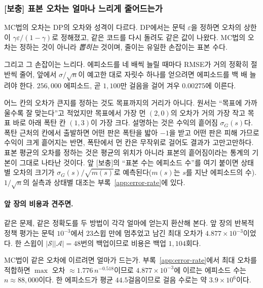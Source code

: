 \documentclass[11pt,a4paper]{article}
\newcommand{\Sset}{\mathcal{S}}
\newcommand{\Aset}{\mathcal{A}}
\begin{document}
\subsubsection{[보충] 표본 오차는 얼마나 느리게 줄어드는가}
\label{sec:error-rate}

MC법의 오차는 DP의 오차와 성격이 다르다. DP에서는 문턱 $\varepsilon$을 정하면 오차의 상한이
$\gamma\varepsilon/(1-\gamma)$로 정해졌고, 같은 코드를 다시 돌려도 같은 값이 나왔다. MC법의 오차는
정하는 것이 아니라 \emph{뽑히는} 것이며, 줄이는 유일한 손잡이는 표본 수다.

그리고 그 손잡이는 느리다. 에피소드를 네 배씩 늘릴 때마다 RMSE가 거의 정확히 절반씩 줄어, 앞에서
$\sigma/\sqrt{n}$이 예고한 대로 자릿수 하나를 얻으려면 에피소드를 백 배 늘려야 한다. $256{,}000$
에피소드, 곧 $1{,}100$만 걸음을 걸어 겨우 $0.00275$에 이른다.

어느 칸의 오차가 큰지를 정하는 것도 목표까지의 거리가 아니다. 원서는 ``목표에 가까울수록 잘
맞는다''고 적었지만 목표에서 가장 먼 $(2,0)$의 오차가 거의 가장 작고 목표 바로 아래 폭탄 칸
$(1,3)$이 가장 크다. 설명하는 것은 수익의 흩어짐 $\sigma_G(s)$다. 폭탄 근처의 칸에서 출발하면 어떤
판은 폭탄을 밟아 $-1$을 받고 어떤 판은 피해 가므로 수익이 크게 흩어지는 반면, 폭탄에서 먼 칸은
무작위로 걸어도 결과가 고만고만하다. 표본 평균의 오차를 정하는 것은 평균의 위치가 아니라 표본의
흩어짐이라는 통계의 기본이 그대로 나타난 것이다. 앞 [보충]의 ``표본 수는 에피소드 수''를 여기 붙이면
상태별 오차의 크기가 $\sigma_G(s)/\sqrt{m(s)}$로 예측된다($m(s)$는 $s$를 지난 에피소드의 수).
$1/\sqrt{n}$의 실측과 상태별 대조는 부록~\ref{app:error-rate}에 있다.

\paragraph{앞 장의 비용과 견주면.}
같은 문제, 같은 정확도를 두 방법이 각각 얼마에 얻는지 환산해 본다. 앞 장의 반복적 정책 평가는 문턱
$10^{-3}$에서 $23$스윕 만에 멈추었고 남긴 최대 오차가 $4.877\times10^{-3}$이었다. 한 스윕이
$|\Sset||\Aset|=48$번의 백업이므로 비용은 백업 $1{,}104$회다.

MC법이 같은 오차에 이르려면 얼마가 드는가. 부록~\ref{app:error-rate}에서 최대 오차를 적합하면
$\max$ 오차 $\approx 1.776\,n^{-0.518}$이므로 $4.877\times10^{-3}$에 이르는 에피소드 수는
$n \approx 88{,}000$이다. 한 에피소드가 평균 $44.5$걸음이므로 걸음 수로는 약
$3.9\times10^{6}$이다.
\end{document}
